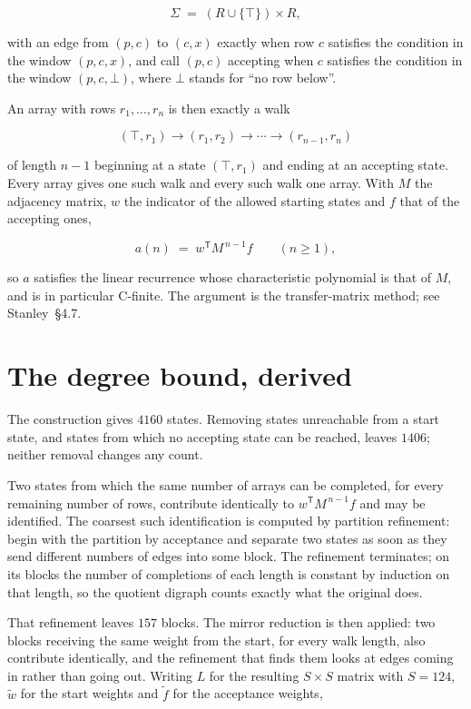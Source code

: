 \documentclass[11pt]{article}
\theoremstyle{definition}
\begin{document}
\[\Sigma \;=\; (R \cup \{\top\}) \times R,\]

with an edge from $(p,c)$ to $(c,x)$ exactly when row $c$ satisfies the condition in the window $(p,c,x)$, and call $(p,c)$ accepting when $c$ satisfies the condition in the window $(p,c,\bot)$, where $\bot$ stands for ``no row below''.

An array with rows $r_1,\dots,r_n$ is then exactly a walk

\[(\top,r_1) \to (r_1,r_2) \to \cdots \to (r_{n-1},r_n)\]

of length $n-1$ beginning at a state $(\top,r_1)$ and ending at an accepting state. Every array gives one such walk and every such walk one array. With $M$ the adjacency matrix, $w$ the indicator of the allowed starting states and $f$ that of the accepting ones,

\[a(n) \;=\; w^{\mathsf T} M^{\,n-1} f \qquad (n \ge 1),\]

so $a$ satisfies the linear recurrence whose characteristic polynomial is that of $M$, and is in particular C-finite. The argument is the transfer-matrix method; see Stanley~\S4.7.

\section{The degree bound, derived}

The construction gives $4160$ states. Removing states unreachable from a start state, and states from which no accepting state can be reached, leaves $1406$; neither removal changes any count.

Two states from which the same number of arrays can be completed, for every remaining number of rows, contribute identically to $w^{\mathsf T}M^{\,n-1}f$ and may be identified. The coarsest such identification is computed by partition refinement: begin with the partition by acceptance and separate two states as soon as they send different numbers of edges into some block. The refinement terminates; on its blocks the number of completions of each length is constant by induction on that length, so the quotient digraph counts exactly what the original does.

That refinement leaves $157$ blocks. The mirror reduction is then applied: two blocks receiving the same weight from the start, for every walk length, also contribute identically, and the refinement that finds them looks at edges coming in rather than going out. Writing $L$ for the resulting $S \times S$ matrix with $S = 124$, $\tilde w$ for the start weights and $\tilde f$ for the acceptance weights,
\end{document}
